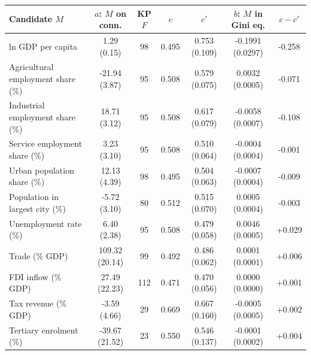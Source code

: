 \begin{tabular}{lcccccc}
\toprule
Candidate $M$ & $a$: $M$ on conn. & KP $F$ & $c$ & $c'$ & $b$: $M$ in Gini eq. & $c-c'$ \\
\midrule
ln GDP per capita & 1.29\sym{***} (0.15) & 98 & 0.495 & 0.753\sym{***} (0.109) & -0.1991\sym{***} (0.0297) & -0.258 \\
Agricultural employment share (\%) & -21.94\sym{***} (3.87) & 95 & 0.508 & 0.579\sym{***} (0.075) & 0.0032\sym{***} (0.0005) & -0.071 \\
Industrial employment share (\%) & 18.71\sym{***} (3.12) & 95 & 0.508 & 0.617\sym{***} (0.079) & -0.0058\sym{***} (0.0007) & -0.108 \\
Service employment share (\%) & 3.23 (3.10) & 95 & 0.508 & 0.510\sym{***} (0.064) & -0.0004 (0.0004) & -0.001 \\
Urban population share (\%) & 12.13\sym{***} (4.39) & 98 & 0.495 & 0.504\sym{***} (0.063) & -0.0007\sym{**} (0.0004) & -0.009 \\
Population in largest city (\%) & -5.72\sym{*} (3.10) & 80 & 0.512 & 0.515\sym{***} (0.070) & 0.0005 (0.0004) & -0.003 \\
Unemployment rate (\%) & 6.40\sym{***} (2.38) & 95 & 0.508 & 0.479\sym{***} (0.058) & 0.0046\sym{***} (0.0005) & +0.029 \\
Trade (\% GDP) & 109.32\sym{***} (20.14) & 99 & 0.492 & 0.486\sym{***} (0.062) & 0.0001 (0.0001) & +0.006 \\
FDI inflow (\% GDP) & 27.49 (22.23) & 112 & 0.471 & 0.470\sym{***} (0.056) & 0.0000 (0.0000) & +0.001 \\
Tax revenue (\% GDP) & -3.59 (4.66) & 29 & 0.669 & 0.667\sym{***} (0.160) & -0.0005 (0.0005) & +0.002 \\
Tertiary enrolment (\%) & -39.67\sym{*} (21.52) & 23 & 0.550 & 0.546\sym{***} (0.137) & -0.0001 (0.0002) & +0.004 \\
\bottomrule
\end{tabular}